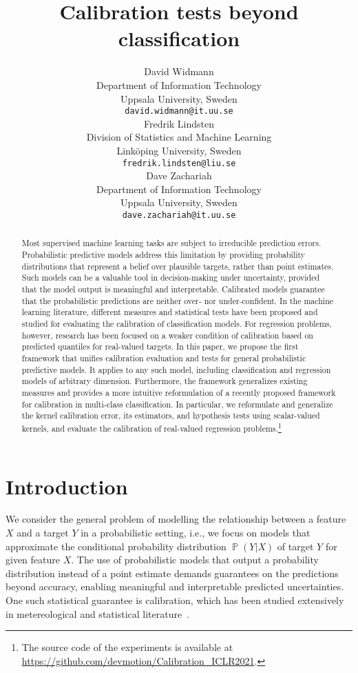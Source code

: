 \documentclass{article}
\title{Calibration tests beyond classification}
\author{%
  David Widmann\\
  Department of Information Technology\\
  Uppsala University, Sweden\\
  \texttt{david.widmann@it.uu.se} \\
  \And
  Fredrik Lindsten\\
  Division of Statistics and Machine Learning\\
  Linköping University, Sweden\\
  \texttt{fredrik.lindsten@liu.se} \\
  \And
  Dave Zachariah\\
  Department of Information Technology\\
  Uppsala University, Sweden\\
  \texttt{dave.zachariah@it.uu.se}\\
}
\DeclareMathOperator{\Prob}{\mathbb{P}}
\begin{document}
\maketitle

\begin{abstract}
Most supervised machine learning tasks are subject to irreducible prediction
errors. Probabilistic predictive models address this limitation by providing
probability distributions that represent a belief over plausible targets,
rather than point estimates. Such models can be a valuable tool in
decision-making under uncertainty, provided that the model output is
meaningful and interpretable. Calibrated models guarantee that the probabilistic
predictions are neither over- nor under-confident. In the machine learning literature,
different measures and statistical tests have been proposed and studied
for evaluating the calibration of classification models. For
regression problems, however, research has been focused on a weaker
condition of calibration based on predicted quantiles for real-valued targets.
In this paper, we propose the first framework that unifies calibration evaluation and
tests for general probabilistic predictive models. It applies to any such model, including
classification and regression models of arbitrary dimension. Furthermore,
the framework generalizes existing measures and provides a more intuitive
reformulation of a recently proposed framework for calibration in
multi-class classification. In particular, we reformulate and generalize the
kernel calibration error, its estimators, and hypothesis tests using scalar-valued
kernels, and evaluate the calibration of real-valued regression
problems.\footnote{The source code of the experiments is available at
  \url{https://github.com/devmotion/Calibration_ICLR2021}.}
\end{abstract}

\section{Introduction}

We consider the general problem of modelling the relationship
between a feature $X$ and a target $Y$ in a probabilistic setting, i.e., we
focus on models that approximate the conditional probability
distribution $\Prob(Y | X)$ of target $Y$ for given feature $X$. The use of
probabilistic models that output a probability distribution instead
of a point estimate demands guarantees on the predictions beyond accuracy,
enabling meaningful and interpretable predicted uncertainties. One such statistical
guarantee is calibration, which has been studied extensively in metereological
and statistical literature~\citep{DeGroot1983,Murphy1977}.
\end{document}
